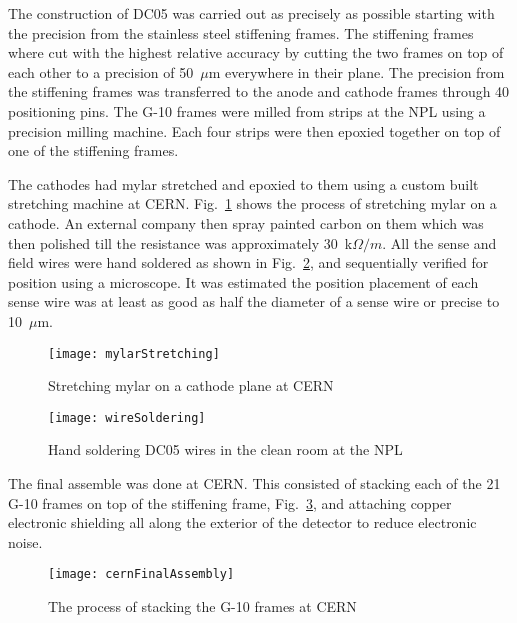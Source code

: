 The construction of DC05 was carried out as precisely as possible starting with
the precision from the stainless steel stiffening frames.  The stiffening frames
where cut with the highest relative accuracy by cutting the two frames on top of
each other to a precision of 50~$\mu$m everywhere in their plane.  The precision
from the stiffening frames was transferred to the anode and cathode frames
through 40 positioning pins.  The G-10 frames were milled from strips at the NPL
using a precision milling machine.  Each four strips were then epoxied together
on top of one of the stiffening frames.

The cathodes had mylar stretched and epoxied to them using a custom built
stretching machine at CERN.  Fig.~\ref{fig::mylarStretching} shows the process
of stretching mylar on a cathode.  An external company then spray painted carbon
on them which was then polished till the resistance was approximately
30~k$\Omega /m$.  All the sense and field wires were hand soldered as shown in
Fig.~\ref{fig::wireSoldering}, and sequentially verified for position using a
microscope.  It was estimated the position placement of each sense wire was at
least as good as half the diameter of a sense wire or precise to 10~$\mu$m.

\begin{figure}[h!t]
  \centering \texttt{[image: mylarStretching]}
  \caption{Stretching mylar on a cathode plane at CERN}
  \label{fig::mylarStretching}
\end{figure}

\begin{figure}[h!t]
  \centering \texttt{[image: wireSoldering]}
  \caption{Hand soldering DC05 wires in the clean room at the NPL}
  \label{fig::wireSoldering}
\end{figure}

The final assemble was done at CERN.  This consisted of stacking each of the 21
G-10 frames on top of the stiffening frame, Fig.~\ref{fig::cernFinalAssembly},
and attaching copper electronic shielding all along the exterior of the detector
to reduce electronic noise.

\begin{figure}[h!t]
  \centering \texttt{[image: cernFinalAssembly]}
  \caption{The process of stacking the G-10 frames at CERN}
  \label{fig::cernFinalAssembly}
\end{figure}

